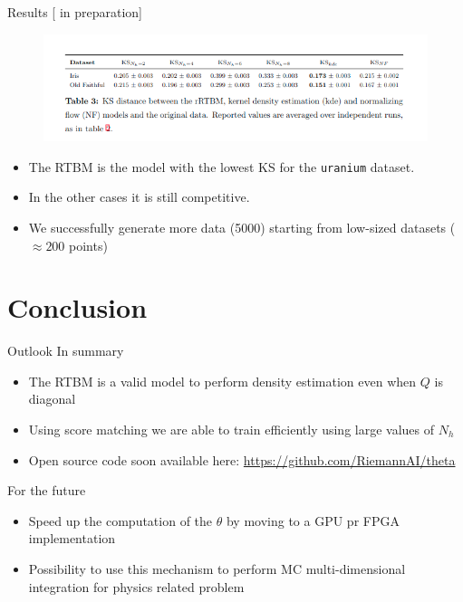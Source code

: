 \documentclass[10pt]{beamer}
\begin{document}
\begin{frame}{Results \hfill \small [\cite{new} in preparation]}
    \begin{figure}
        \centering
        \includegraphics[scale=0.6]{figures/table2.png}
    \end{figure}
    \begin{itemize}
        \item[\faArrowRight] The RTBM is the model with the lowest KS for the \texttt{uranium} dataset.
        \item[\faArrowRight] In the other cases it is still competitive.
        \item[\faArrowRight] We successfully generate more data (5000) starting
        from low-sized datasets ($\approx 200$ points)
    \end{itemize}
    
    
\end{frame}



    

\section{Conclusion}

\begin{frame}{Outlook}
    In summary
    \begin{itemize}
        \item The RTBM is a valid model to perform density estimation even when $Q$ is diagonal
        \item Using score matching we are able to train efficiently using large values of $N_h$
        \item Open source code soon available here: \url{https://github.com/RiemannAI/theta}
    \end{itemize}
    
    For the future
    \begin{itemize}
        \item Speed up the computation of the $\theta$ by moving to a GPU pr FPGA implementation
        \item Possibility to use this mechanism to perform MC multi-dimensional integration for physics related problem
    \end{itemize}
\end{frame}
\end{document}
